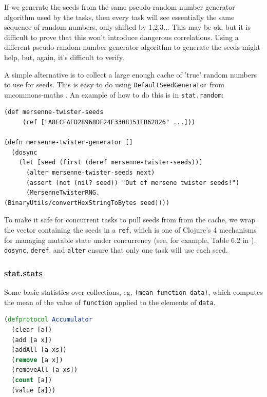 \documentclass[10pt,openany]{article}
\numberwithin{definition}{section}
\numberwithin{example}{section}
\numberwithin{equation}{section}
\numberwithin{figure}{section}
\begin{document}
If we generate the seeds from the same pseudo-random number generator
algorithm used by the tasks, then every task will see essentially
the same sequence of random numbers, only shifted by 1,2,3... This
may be ok, but it is difficult to prove that this won't introduce
dangerous correlations. Using a different pseudo-random number generator
algorithm to generate the seeds might help, but, again, it's difficult
to verify.

A simple alternative is to collect a large enough cache of 'true'
random numbers to use for seeds. This is easy to do using \texttt{DefaultSeedGenerator}
from uncommons-maths \cite{uncommons-maths-2012}. An example of how
to do this is in \texttt{stat.random}:

\begin{minipage}[t]{1\columnwidth}%
\begin{lstlisting}[caption={Independent random number generators},label={lis:independent-seeds}]
(def mersenne-twister-seeds 
     (ref ["A8ECFAFD28968DF24F3308151EB62826" ...]))

(defn mersenne-twister-generator [] 
  (dosync 
    (let [seed (first (deref mersenne-twister-seeds))] 
      (alter mersenne-twister-seeds next) 
      (assert (not (nil? seed)) "Out of mersene twister seeds!") 
      (MersenneTwisterRNG. 
(BinaryUtils/convertHexStringToBytes seed)))) 
\end{lstlisting}
%
\end{minipage}

To make it safe for concurrent tasks to pull seeds from from the cache,
we wrap the vector containing the seeds in a \texttt{ref}, which is
one of Clojure's 4 mechanisms for managing mutable state under concurrency
(see, for example, Table 6.2 in \cite{rathore2011clojure}). \texttt{dosync},
\texttt{deref}, and \texttt{alter} ensure that only one task will
use each seed.

\subsubsection{stat.stats}

Some basic statistics over collections, eg, \texttt{(mean~function~data)},
which computes the mean of the value of \texttt{function} applied
to the elements of \texttt{data}.

\begin{minipage}[t]{1\columnwidth}%
\begin{lstlisting}[caption={Updatable cost functions},label={lis:accumulator},language=clojure,tabsize=2]
(defprotocol Accumulator
  (clear [a])
  (add [a x])
  (addAll [a xs])
  (remove [a x])
  (removeAll [a xs])
  (count [a])
  (value [a])) 
\end{lstlisting}
%
\end{minipage}
\end{document}

